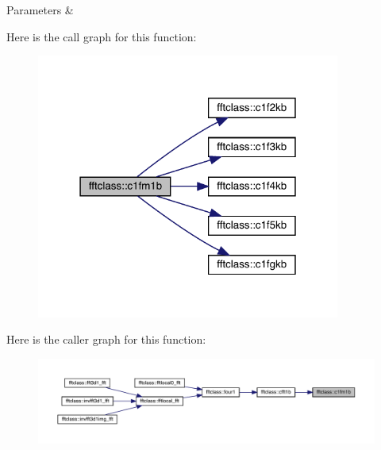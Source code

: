 \begin{DoxyParams}{Parameters}
{\em } & \\
\hline
\end{DoxyParams}
Here is the call graph for this function\+:\nopagebreak
\begin{figure}[H]
\begin{center}
\leavevmode
\includegraphics[width=283pt]{namespacefftclass_a2f5368919279e1986ee34764caa05fe0_cgraph}
\end{center}
\end{figure}
Here is the caller graph for this function\+:\nopagebreak
\begin{figure}[H]
\begin{center}
\leavevmode
\includegraphics[width=350pt]{namespacefftclass_a2f5368919279e1986ee34764caa05fe0_icgraph}
\end{center}
\end{figure}
\mbox{\label{namespacefftclass_a8870afa6b2bab24460d719026aa6e0d8}} 
